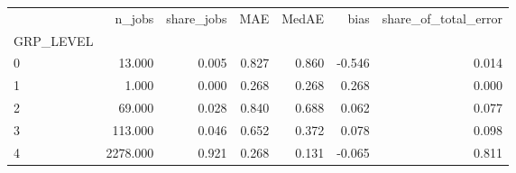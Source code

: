 \begin{tabular}{lrrrrrr}
\toprule
 & n_jobs & share_jobs & MAE & MedAE & bias & share_of_total_error \\
GRP_LEVEL &  &  &  &  &  &  \\
\midrule
0 & 13.000 & 0.005 & 0.827 & 0.860 & -0.546 & 0.014 \\
1 & 1.000 & 0.000 & 0.268 & 0.268 & 0.268 & 0.000 \\
2 & 69.000 & 0.028 & 0.840 & 0.688 & 0.062 & 0.077 \\
3 & 113.000 & 0.046 & 0.652 & 0.372 & 0.078 & 0.098 \\
4 & 2278.000 & 0.921 & 0.268 & 0.131 & -0.065 & 0.811 \\
\bottomrule
\end{tabular}
